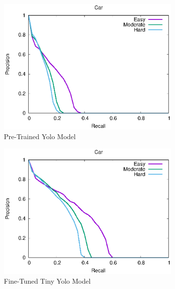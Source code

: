 \begin{figure}[H]
\begin{subfigure}{.34\textwidth}
    \centering
    \includegraphics[width=1.0\linewidth]{img/yolo_Nov_4/plot_valid/car_detection.eps}
    \caption{Pre-Trained Yolo Model}
\end{subfigure}%
\begin{subfigure}{.34\textwidth}
    \centering
    \includegraphics[width=1.0\linewidth]{img/yolo_Nov_9/plot_valid/car_detection.eps}
    \caption{Fine-Tuned Tiny Yolo Model}
\end{subfigure}%
\begin{subfigure}{.34\textwidth}
    \centering

\end{subfigure}
\end{figure}
